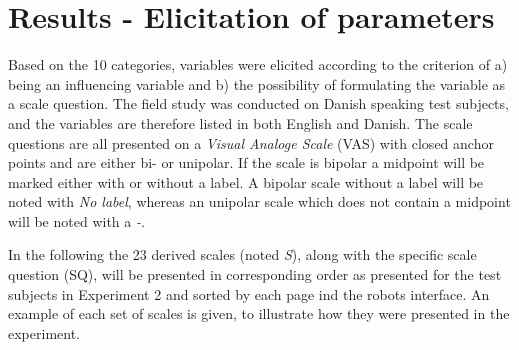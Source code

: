\section{Results - Elicitation of parameters}
\label{ResultsElicitation}
%
Based on the 10 categories, variables were elicited according to the criterion of a) being an influencing variable and b) the possibility of formulating the variable as a scale question. The field study was conducted on Danish speaking test subjects, and the variables are therefore listed in both English and Danish. The scale questions are all presented on a \textit{Visual Analoge Scale} (VAS) with closed anchor points and are either bi- or unipolar. If the scale is bipolar a midpoint will be marked either with or without a label. A bipolar scale without a label will be noted with \textit{No label}, whereas an unipolar scale which does not contain a midpoint will be noted with a \textit{-}. 

In the following the 23 derived scales (noted \textit{S}), along with the specific scale question (SQ), will be presented in corresponding order as presented for the test subjects in Experiment 2 and sorted by each page ind the robots interface. An example of each set of scales is given, to illustrate how they were presented in the experiment.
